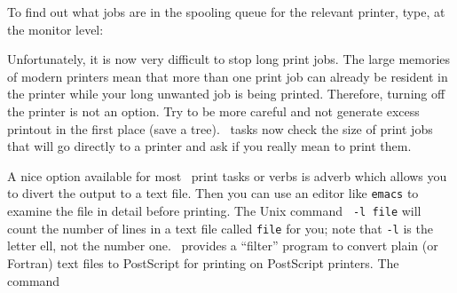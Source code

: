 
     To find out what jobs are in the spooling queue for the relevant
printer, type, at the monitor level:

     Unfortunately, it is now very difficult to stop long print jobs.
The large memories of modern printers mean that more than one print
job can already be resident in the printer while your long unwanted
job is being printed.  Therefore, turning off the printer is not an
option.  Try to be more careful and not generate excess printout in
the first place (save a tree).  \AIPS\ tasks now check the size of
print jobs that will go directly to a printer and ask if you really
mean to print them.

     A nice option available for most \AIPS\ print tasks or verbs
is adverb {\tt {}} which allows you to divert the output
to a text file.  Then you can use an editor like {\tt emacs} to
examine the file in detail before printing.  The Unix command {\tt
{} -l {\tt file}} will count the number of lines in a text file
called {\tt file} for you; note that {\tt -l} is the letter ell, not
the number one.  \AIPS\ provides a ``filter'' program to convert plain
(or Fortran) text files to PostScript for printing on PostScript
printers.  The command



